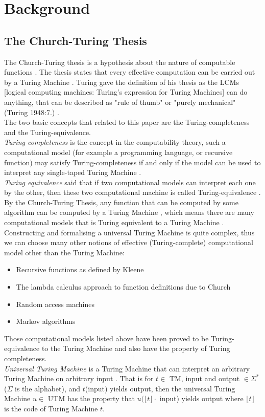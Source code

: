 \documentclass{jfrarticle}
\begin{document}
\section{Background}
\subsection{The Church-Turing Thesis}
The Church-Turing thesis is a hypothesis about the nature of computable functions \cite{church_unsolvable_1936}.
The thesis states that every effective computation can be carried out by a Turing Machine \cite{copeland_church-turing_2002}.
Turing gave the definition of his thesis as the LCMs [logical computing machines: Turing's expression for Turing Machines] can do anything, that can be described as "rule of thumb" or "purely mechanical" (Turing 1948:7.) \cite{copeland_church-turing_2002}.\\
The two basic concepts that related to this paper are the Turing-completeness and the Turing-equivalence.\\
\textit{Turing completeness} is the concept in the computability theory, such a computational model (for example a programming language, or recursive function) may satisfy Turing-completeness if and only if the model can be used to interpret any single-taped Turing Machine \cite{rogers_theory_1987}.\\
\textit{Turing equivalence} said that if two computational models can interpret each one by the other, then these two computational machine is called Turing-equivalence \cite{rogers_theory_1987}.\\
By the Church-Turing Thesis, any function that can be computed by some algorithm can be computed by a Turing Machine \cite{church_unsolvable_1936}, which means there are many computational models that is Turing equivalent to a Turing Machine \cite{copeland_church-turing_2002}.
Constructing and formalising a universal Turing Machine is quite complex, thus we can choose many other notions of effective (Turing-complete) computational model other than the Turing Machine:
\begin{itemize}
  \item Recursive functions as defined by Kleene \cite{yasuhara_recursive_1971}
  \item The lambda calculus approach to function definitions due to Church \cite{moggi_computational_1988}
  \item Random access machines \cite{cook_time-bounded_1972}
  \item Markov algorithms \cite{markov_2015}
\end{itemize}
Those computational models listed above have been proved to be Turing-equivalence to the Turing Machine and also have the property of Turing completeness.\\
\textit{Universal Turing Machine} is a Turing Machine that can interpret an arbitrary Turing Machine on arbitrary input \cite{universal_2016}. 
That is for $t \in$ TM, input and output $\in \Sigma^{*}$ ($\Sigma$ is the alphabet), and $t$(input) yields output, then the universal Turing Machine $u\in$ UTM has the property that $u(\lfloor t\rfloor \cdot$ input) yields output where $\lfloor t\rfloor$ is the code of Turing Machine $t$.
\end{document}

